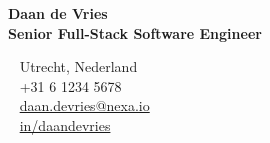 \documentclass[10pt,a4paper]{article}
\begin{document}
\begin{tcolorbox}[colback=primary,colframe=primary,arc=3mm,boxrule=0pt,top=6mm,bottom=6mm,left=8mm,right=8mm]
  \begin{minipage}[c]{0.62\textwidth}
    {\color{white}\Huge\bfseries Daan de Vries} \\[1.5mm]
    {\color{accent}\large\bfseries Senior Full-Stack Software Engineer}
  \end{minipage}%
  \hfill%
  \begin{minipage}[c]{0.33\textwidth}
    \flushright
    {\color{white}\footnotesize
    \faMapMarker ~ Utrecht, Nederland \\
    \faPhone ~ +31 6 1234 5678 \\
    \faEnvelope ~ \href{mailto:daan.devries@nexa.io}{\color{white}daan.devries@nexa.io} \\
    \faLinkedin ~ \href{https://linkedin.com}{\color{white}in/daandevries}
    }
  \end{minipage}
\end{tcolorbox}

\vspace{5mm}
\end{document}

